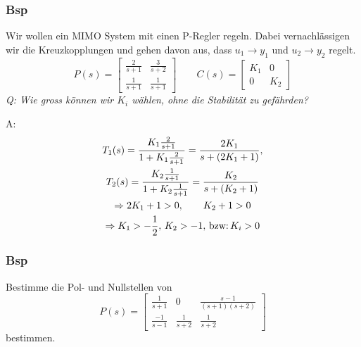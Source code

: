     \subsubsection{Bsp}
        Wir wollen ein MIMO System mit einen P-Regler regeln. Dabei vernachlässigen wir die Kreuzkopplungen und gehen davon aus, dass $u_1 \rightarrow y_1$ und $u_2 \rightarrow y_2$ regelt.
        \begin{equation*}
            P(s) =
            \begin{bmatrix}
            \frac{2}{s+1}  &    \frac{3}{s+2}\\
            \frac{1}{s+1}  &    \frac{1}{s+1}
            \end{bmatrix}
            \qquad
            C(s) = 
            \begin{bmatrix}
            K_1 & 0\\
            0   & K_2
            \end{bmatrix}
        \end{equation*}
        \textit{Q: Wie gross können wir $K_i$ wählen, ohne die Stabilität zu gefährden?}
        
        A: 
        \begin{gather*}
            T_1(s) = \frac{K_1\frac{2}{s+1}}{1 + K_1\frac{2}{s+1}} = \frac{2K_1}{s +(2K_1 + 1)},\\
            T_2(s) = \frac{K_2\frac{1}{s+1}}{1 + K_2\frac{1}{s+1}} = \frac{K_2}{s + (K_2 + 1)}\\
            \Rightarrow 2K_1 + 1 > 0, \qquad K_2 + 1 > 0\\
            \Rightarrow K_1 > -\frac{1}{2},\, K_2 > -1,\, \textnormal{bzw:}\, K_i > 0
        \end{gather*}
        
    \subsubsection{Bsp}
        Bestimme die Pol- und Nullstellen von
        \begin{equation*}
            P(s) = 
            \begin{bmatrix}
            \frac{1}{s+1}   &   0   &   \frac{s-1}{(s+1)(s+2)}\\
            \frac{-1}{s-1}  &   \frac{1}{s+2} & \frac{1}{s+2}
            \end{bmatrix}
        \end{equation*}
        bestimmen.
        
